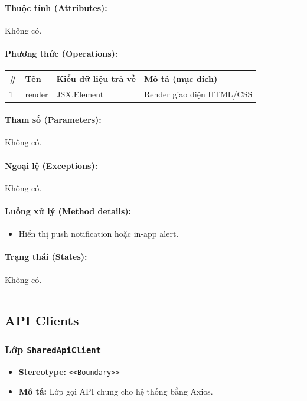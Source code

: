 \documentclass[12pt,a4paper]{article}
\begin{document}
\paragraph{Thuộc tính (Attributes):}
Không có.

\paragraph{Phương thức (Operations):}
\begin{longtable}{|p{0.6cm}|p{3.8cm}|p{2.6cm}|p{6.5cm}|}
\hline
\textbf{\#} & \textbf{Tên} & \textbf{Kiểu dữ liệu trả về} & \textbf{Mô tả (mục đích)} \\ \hline
\endhead
1 & render & JSX.Element & Render giao diện HTML/CSS \\ \hline
\end{longtable}

\paragraph{Tham số (Parameters):}
Không có.

\paragraph{Ngoại lệ (Exceptions):}
Không có.

\paragraph{Luồng xử lý (Method details):}
\begin{itemize}[leftmargin=*]
    \item Hiển thị push notification hoặc in-app alert.
\end{itemize}


\paragraph{Trạng thái (States):}
Không có.

\vskip 0.5cm
\noindent\rule{\textwidth}{0.5pt}
\vskip 0.5cm

\subsection{API Clients}

\subsubsection{Lớp \texttt{SharedApiClient}}
\begin{itemize}[leftmargin=*]
    \item \textbf{Stereotype:} \texttt{\textless{}\textless{}Boundary\textgreater{}\textgreater{}}
    \item \textbf{Mô tả:} Lớp gọi API chung cho hệ thống bằng Axios.
\end{itemize}
\end{document}
